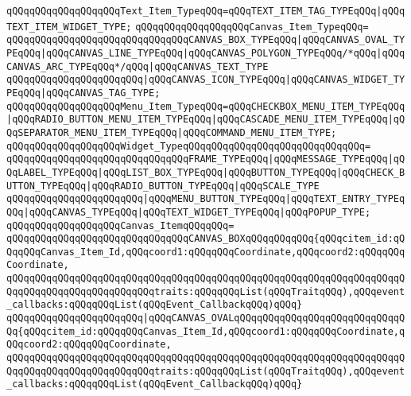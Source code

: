 \newline
\verb|qQQqqQQqqQQqqQQqqQQqText_Item_TypeqQQq=qQQqTEXT_ITEM_TAG_TYPEqQQq|\verb#|qQQqTEXT_ITEM_WIDGET_TYPE;#\newline
\newline
\verb|qQQqqQQqqQQqqQQqqQQqCanvas_Item_TypeqQQq=|\newline
\verb|qQQqqQQqqQQqqQQqqQQqqQQqqQQqqQQqCANVAS_BOX_TYPEqQQq|\verb#|qQQqCANVAS_OVAL_TYPEqQQq|qQQqCANVAS_LINE_TYPEqQQq|qQQqCANVAS_POLYGON_TYPEqQQq/*qQQq|qQQqCANVAS_ARC_TYPEqQQq*/qQQq|qQQqCANVAS_TEXT_TYPE#\newline
\verb|qQQqqQQqqQQqqQQqqQQqqQQq|\verb#|qQQqCANVAS_ICON_TYPEqQQq|qQQqCANVAS_WIDGET_TYPEqQQq|qQQqCANVAS_TAG_TYPE;#\newline
\newline
\verb|qQQqqQQqqQQqqQQqqQQqMenu_Item_TypeqQQq=qQQqCHECKBOX_MENU_ITEM_TYPEqQQq|\verb#|qQQqRADIO_BUTTON_MENU_ITEM_TYPEqQQq|qQQqCASCADE_MENU_ITEM_TYPEqQQq|qQQqSEPARATOR_MENU_ITEM_TYPEqQQq|qQQqCOMMAND_MENU_ITEM_TYPE;#\newline
\newline
\verb|qQQqqQQqqQQqqQQqqQQqWidget_TypeqQQqqQQqqQQqqQQqqQQqqQQqqQQqqQQq=|\newline
\verb|qQQqqQQqqQQqqQQqqQQqqQQqqQQqqQQqFRAME_TYPEqQQq|\verb#|qQQqMESSAGE_TYPEqQQq|qQQqLABEL_TYPEqQQq|qQQqLIST_BOX_TYPEqQQq|qQQqBUTTON_TYPEqQQq|qQQqCHECK_BUTTON_TYPEqQQq|qQQqRADIO_BUTTON_TYPEqQQq|qQQqSCALE_TYPE#\newline
\verb|qQQqqQQqqQQqqQQqqQQqqQQq|\verb#|qQQqMENU_BUTTON_TYPEqQQq|qQQqTEXT_ENTRY_TYPEqQQq|qQQqCANVAS_TYPEqQQq|qQQqTEXT_WIDGET_TYPEqQQq|qQQqPOPUP_TYPE;#\newline
\newline
\verb|qQQqqQQqqQQqqQQqqQQqCanvas_ItemqQQqqQQq=|\newline
\verb|qQQqqQQqqQQqqQQqqQQqqQQqqQQqqQQqCANVAS_BOXqQQqqQQqqQQq{qQQqcitem_id:qQQqqQQqCanvas_Item_Id,qQQqcoord1:qQQqqQQqCoordinate,qQQqcoord2:qQQqqQQqCoordinate,|\newline
\verb|qQQqqQQqqQQqqQQqqQQqqQQqqQQqqQQqqQQqqQQqqQQqqQQqqQQqqQQqqQQqqQQqqQQqqQQqqQQqqQQqqQQqqQQqqQQqqQQqtraits:qQQqqQQqList(qQQqTraitqQQq),qQQqevent_callbacks:qQQqqQQqList(qQQqEvent_CallbackqQQq)qQQq}|\newline
\verb|qQQqqQQqqQQqqQQqqQQqqQQq|\verb#|qQQqCANVAS_OVALqQQqqQQqqQQqqQQqqQQqqQQqqQQqqQQq{qQQqcitem_id:qQQqqQQqCanvas_Item_Id,qQQqcoord1:qQQqqQQqCoordinate,qQQqcoord2:qQQqqQQqCoordinate,#\newline
\verb|qQQqqQQqqQQqqQQqqQQqqQQqqQQqqQQqqQQqqQQqqQQqqQQqqQQqqQQqqQQqqQQqqQQqqQQqqQQqqQQqqQQqqQQqqQQqqQQqtraits:qQQqqQQqList(qQQqTraitqQQq),qQQqevent_callbacks:qQQqqQQqList(qQQqEvent_CallbackqQQq)qQQq}|\newline
